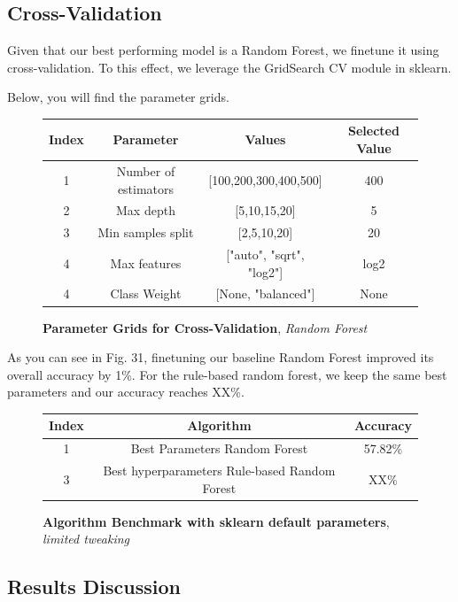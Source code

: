 \documentclass[12pt]{report}
\begin{document}
\subsection{Cross-Validation}
Given that our best performing model is a Random Forest, we finetune it using cross-validation. To this effect, we leverage the GridSearch CV module in sklearn. 

Below, you will find the parameter grids. 

\begin{figure}[h!]
\begin{center}
\begin{tabular}{ |c|c|c|c| }
\hline
 Index & Parameter & Values & Selected Value \\
 \hline\hline
 1 & Number of estimators & [100,200,300,400,500] & 400 \\  
 2 & Max depth & [5,10,15,20] & 5 \\
 3 & Min samples split & [2,5,10,20] & 20 \\
 4 & Max features & ["auto", "sqrt", "log2"] & log2 \\
 4 & Class Weight & [None, "balanced"] & None \\
 
\hline
\end{tabular}
\end{center}
\caption{\textbf{Parameter Grids for Cross-Validation}, \textit{Random Forest}}
\label{fig:crossval}
\end{figure}
As you can see in Fig. 31, finetuning our baseline Random Forest improved its overall accuracy by 1\%. 
For the rule-based random forest, we keep the same best parameters and our accuracy reaches XX\%. 
\begin{figure}[h!]
\begin{center}
\begin{tabular}{ |c|c|c| }
\hline
 Index & Algorithm &  Accuracy \\
 \hline\hline
 1 & Best Parameters Random Forest & 57.82\% \\
 3 & Best hyperparameters Rule-based Random Forest & XX\% \\
\hline
\end{tabular}
\end{center}
\caption{\textbf{Algorithm Benchmark with sklearn default parameters}, \textit{limited tweaking}}
\label{fig:bestbenchmark}
\end{figure}


\subsection{Results Discussion}
\end{document}
